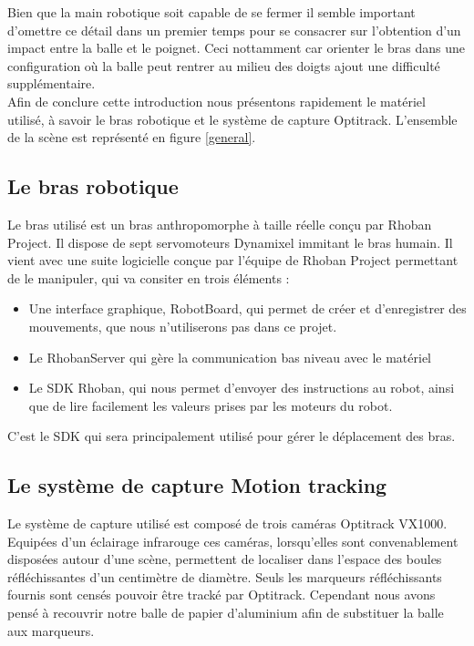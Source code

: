 \documentclass{article}[11pt]
\begin{document}
Bien que la main robotique soit capable de se fermer il semble important d'omettre ce détail dans un premier temps pour se consacrer sur l'obtention d'un impact entre la balle et le poignet. Ceci nottamment car orienter le bras dans une configuration où la balle peut rentrer au milieu des doigts ajout une difficulté supplémentaire. \\

Afin de conclure cette introduction nous présentons rapidement le matériel utilisé, à savoir le bras robotique et le système de capture Optitrack. L'ensemble de la scène est représenté en figure \ref{general}.

\subsection{Le bras robotique}

Le bras utilisé est un bras anthropomorphe à taille réelle conçu par Rhoban Project. Il dispose de sept servomoteurs Dynamixel immitant le bras humain. Il vient avec une suite logicielle conçue par l'équipe de Rhoban Project permettant de le manipuler, qui va consiter en trois éléments : \\

\begin{itemize}
\item Une interface graphique, RobotBoard, qui permet de créer et d'enregistrer des mouvements, que nous n'utiliserons pas dans ce projet. 
\item Le RhobanServer qui gère la communication bas niveau avec le matériel
\item Le SDK Rhoban, qui nous permet d'envoyer des instructions au robot, ainsi que de lire facilement les valeurs prises par les moteurs du robot.\\
\end{itemize}

C'est le SDK qui sera principalement utilisé pour gérer le déplacement des bras.

\subsection{Le système de capture \og Motion tracking\fg}

Le système de capture utilisé est composé de trois caméras Optitrack VX1000. Equipées d'un éclairage infrarouge ces caméras, lorsqu'elles sont convenablement disposées autour d'une scène, permettent de localiser dans l'espace des boules réfléchissantes d'un centimètre de diamètre. Seuls les marqueurs réfléchissants fournis sont censés pouvoir être tracké par Optitrack. Cependant nous avons pensé à recouvrir notre balle de papier d'aluminium afin de substituer la balle aux marqueurs. \\
\end{document}
